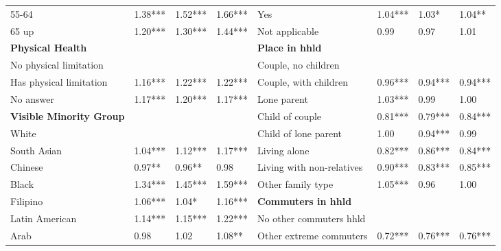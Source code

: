 \documentclass[10 pt,letterpaper]{article}
\begin{document}
\begin{table}[H]
{\begin{tabular}{llllllll}
			55-64                           & 1.38***      & 1.52***     & 1.66***     & Yes                          & 1.04***      & 1.03*       & 1.04**      \\
			65 up                           & 1.20***      & 1.30***     & 1.44***     & Not applicable               & 0.99         & 0.97        & 1.01        \\
			\textbf{Physical Health}        &              &             &             & \textbf{Place in hhld}       &              &             &             \\
			No physical limitation          &              &             &             & Couple, no children          &              &             &             \\
			Has physical limitation         & 1.16***      & 1.22***     & 1.22***     & Couple, with children        & 0.96***        & 0.94***     & 0.94***     \\
			No answer                       & 1.17***      & 1.20***     & 1.17***     & Lone parent                  & 1.03***      & 0.99        & 1.00        \\
			\textbf{Visible Minority Group} &              &             &             & Child of couple              & 0.81***      & 0.79***     & 0.84***     \\
			White                           &              &             &             & Child of lone parent         & 1.00         & 0.94***     & 0.99        \\
			South Asian                     & 1.04***      & 1.12***     & 1.17***     & Living alone                 & 0.82***      & 0.86***     & 0.84***     \\
			Chinese                         & 0.97**       & 0.96**      & 0.98        & Living with non-relatives    & 0.90***      & 0.83***     & 0.85***     \\
			Black                           & 1.34***      & 1.45***     & 1.59***     & Other family type            & 1.05***      & 0.96        & 1.00        \\
			Filipino                        & 1.06***      & 1.04*       & 1.16***     & \textbf{Commuters in hhld}   &              &             &             \\
			Latin American                  & 1.14***      & 1.15***     & 1.22***     & No other commuters hhld      &              &             &             \\
			Arab                            & 0.98         & 1.02        & 1.08**      & Other extreme commuters      & 0.72***      & 0.76***     & 0.76***     \\

\end{tabular}}
\end{table}
\end{document}
